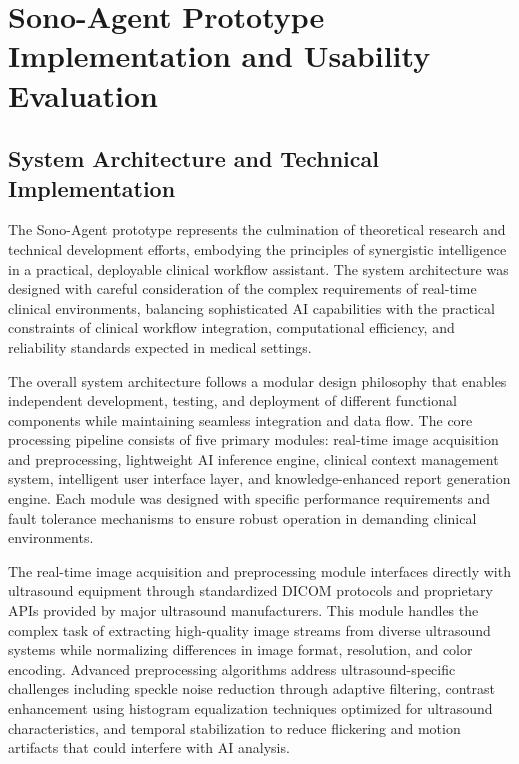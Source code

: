 
\chapter{Sono-Agent Prototype Implementation and Usability Evaluation} \label{chp:sono_agent}

\section{System Architecture and Technical Implementation}

The Sono-Agent prototype represents the culmination of theoretical research and technical development efforts, embodying the principles of synergistic intelligence in a practical, deployable clinical workflow assistant. The system architecture was designed with careful consideration of the complex requirements of real-time clinical environments, balancing sophisticated AI capabilities with the practical constraints of clinical workflow integration, computational efficiency, and reliability standards expected in medical settings.

The overall system architecture follows a modular design philosophy that enables independent development, testing, and deployment of different functional components while maintaining seamless integration and data flow. The core processing pipeline consists of five primary modules: real-time image acquisition and preprocessing, lightweight AI inference engine, clinical context management system, intelligent user interface layer, and knowledge-enhanced report generation engine. Each module was designed with specific performance requirements and fault tolerance mechanisms to ensure robust operation in demanding clinical environments.

The real-time image acquisition and preprocessing module interfaces directly with ultrasound equipment through standardized DICOM protocols and proprietary APIs provided by major ultrasound manufacturers. This module handles the complex task of extracting high-quality image streams from diverse ultrasound systems while normalizing differences in image format, resolution, and color encoding. Advanced preprocessing algorithms address ultrasound-specific challenges including speckle noise reduction through adaptive filtering, contrast enhancement using histogram equalization techniques optimized for ultrasound characteristics, and temporal stabilization to reduce flickering and motion artifacts that could interfere with AI analysis.

